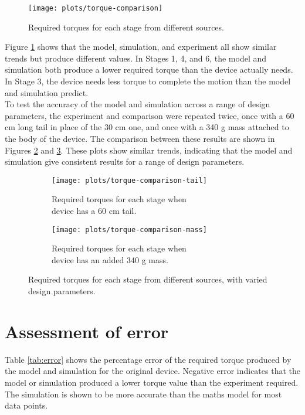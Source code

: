 \begin{figure}[!h]
	\centering
	\texttt{[image: plots/torque-comparison]}
	\caption{Required torques for each stage from different sources.}
	\label{fig:torque-comparison}
\end{figure}

Figure \ref{fig:torque-comparison} shows that the model, simulation, and experiment all show similar trends but produce different values. In Stages 1, 4, and 6, the model and simulation both produce a lower required torque than the device actually needs. In Stage 3, the device needs less torque to complete the motion than the model and simulation predict.\\
To test the accuracy of the model and simulation across a range of design parameters, the experiment and comparison were repeated twice, once with a 60 cm long tail in place of the 30 cm one, and once with a 340 g mass attached to the body of the device. The comparison between these results are shown in Figures \ref{fig:torque-comparison-tail} and \ref{fig:torque-comparison-mass}. These plots show similar trends, indicating that the model and simulation give consistent results for a range of design parameters.

\begin{figure}
	\centering
	\begin{subfigure}{.5\textwidth}
		\centering
		\texttt{[image: plots/torque-comparison-tail]}
		\caption{Required torques for each stage when \\device has a 60 cm tail.}
		\label{fig:torque-comparison-tail}
	\end{subfigure}%
	\begin{subfigure}{.5\textwidth}
		\centering
		\texttt{[image: plots/torque-comparison-mass]}
		\caption{Required torques for each stage when \\device has an added 340 g mass.}
		\label{fig:torque-comparison-mass}
	\end{subfigure}
	\caption{Required torques for each stage from different sources, with varied design parameters.}
	\label{fig:torque-comparison-tailMass}
\end{figure}
 
\section{Assessment of error}

Table \ref{tab:error} shows the percentage error of the required torque produced by the model and simulation for the original device. Negative error indicates that the model or simulation produced a lower torque value than the experiment required. The simulation is shown to be more accurate than the maths model for most data points.\\
 

